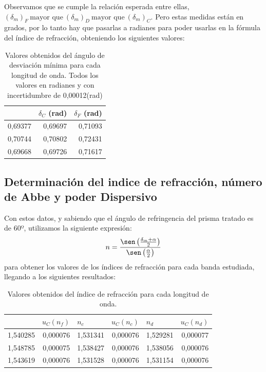 \documentclass[10pt,onecolumn]{article}
\begin{document}
Observamos que se cumple la relación esperada entre ellas, $(\delta_m)_F\ \text{mayor que}\ (\delta_m)_D\ \text{mayor que}\ (\delta_m)_C$.
Pero estas medidas están en grados, por lo tanto hay que pasarlas a radianes para poder usarlas en la fórmula del índice de refracción, obteniendo los siguientes valores:

\begin{table}[H]
\centering
\begin{tabular}{|r|r|r|}
\hline
\rowcolor[rgb]{ .651,  .788,  .925}
\multicolumn{1}{|l|}{$\delta_D$ (rad)} & \multicolumn{1}{l|}{$\delta_C$ (rad)} & \multicolumn{1}{l|}{$\delta_F$ (rad)} \\ \hline
\rowcolor[rgb]{.816,  .816,  .816}0,69377 & 0,69697 & 0,71093 \\ \hline
\rowcolor[rgb]{.816,  .816,  .816}0,70744 & 0,70802 & 0,72431 \\ \hline
\rowcolor[rgb]{.816,  .816,  .816}0,69668 & 0,69726 & 0,71617 \\ \hline
\end{tabular}
\caption{Valores obtenidos del ángulo de desviación mínima para cada longitud de onda. Todos los valores en radianes y con incertidumbre de 0,00012(rad)}\label{tab:delta_rad}
\end{table}

\subsection{Determinación del indice de refracción, número de Abbe y poder Dispersivo}

Con estos datos, y sabiendo que el ángulo de refringencia del prisma tratado es de 60º,
utilizamos la siguiente expresión: 
\[
n = \frac{\sen\left( \frac{\delta_m + \alpha}{2} \right)}{\sen\left( \frac{\alpha}{2} \right)}
\]
 para obtener los valores de los índices de refracción para cada banda estudiada, llegando a los siguientes resultados: 

\begin{table}[H]
\centering
\begin{tabular}{|r|r|r|r|r|r|}
\hline
\rowcolor[rgb]{ .651,  .788,  .925}
\multicolumn{1}{|l|}{$n_f$} & \multicolumn{1}{l|}{$u_C(n_f)$} & \multicolumn{1}{l|}{$n_c$} & \multicolumn{1}{l|}{$u_C(n_c)$} & \multicolumn{1}{l|}{$n_d$} & \multicolumn{1}{l|}{$u_C(n_d)$} \\ \hline
\rowcolor[rgb]{.816,  .816,  .816}1,540285 & 0,000076 & 1,531341 & 0,000076 & 1,529281 & 0,000077 \\ \hline
\rowcolor[rgb]{.816,  .816,  .816}1,548785 & 0,000075 & 1,538427 & 0,000076 & 1,538056 & 0,000076 \\ \hline
\rowcolor[rgb]{.816,  .816,  .816}1,543619 & 0,000076 & 1,531528 & 0,000076 & 1,531154 & 0,000076 \\ \hline
\end{tabular}
\caption{Valores obtenidos del índice de refracción para cada longitud de onda.}\label{tab:indice_refraccion}
\end{table}
\end{document}
